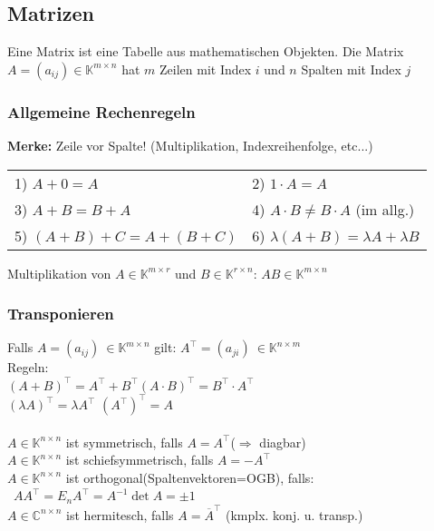\documentclass[6pt,a4paper]{scrartcl}
\begin{document}
\begin{multicols}{4}
\subsection{Matrizen}
Eine Matrix ist eine Tabelle aus mathematischen Objekten.
Die Matrix $A=(a_{ij}) \in \mathbb K^{m\times n}$ hat $m$ Zeilen mit Index $i$ und $n$ Spalten mit Index $j$

\subsubsection{Allgemeine Rechenregeln}
\textbf{Merke:} Zeile vor Spalte! (Multiplikation, Indexreihenfolge, etc...)\\

\begin{tabular}{ll}	
	1)  $A+0=A$ & 2)  $1 \cdot A=A$ \\
	3)  $A+B=B+A$ & 4) $A \cdot B \ne B \cdot A$ (im allg.) \\
	5)  $(A+B)+C=A+(B+C)$ & 6) $\lambda (A+B) = \lambda A + \lambda B$\\ 
\end{tabular}
Multiplikation von $A\in \mathbb K^{m\times r}$ und $B\in \mathbb K^{r\times n}$: $AB\in\mathbb K^{m\times n}$

\subsubsection{Transponieren}
Falls $A=(a_{ij})\ \in \mathbb K^{m\times n}$ gilt: $A^\top=(a_{ji})\ \in \mathbb K^{n\times m}$\\
Regeln:\\
$(A+B)^\top=A^\top+B^\top$\qquad $(A\cdot B)^\top=B^\top\cdot A^\top$\qquad \\ $(\lambda A)^\top=\lambda A^\top$ \qquad $(A^\top)^\top=A$\\
\\
$A\in \mathbb K^{n\times n}$ ist symmetrisch, falls $A=A^\top$\qquad ($\Rightarrow$ diagbar)\\
$A\in \mathbb K^{n\times n}$ ist schiefsymmetrisch, falls $A=-A^\top$\\
$A\in \mathbb K^{n\times n}$ ist orthogonal(Spaltenvektoren=OGB), falls:\\
\qquad\ $AA^\top=E_n$\qquad $A^\top=A^{-1}$\qquad $\det A=\pm 1$\\
$A\in \mathbb C^{n\times n}$ ist hermitesch, falls $A=\overline{A}^\top$  \quad (kmplx. konj. u. transp.)



\end{multicols}
\end{document}

